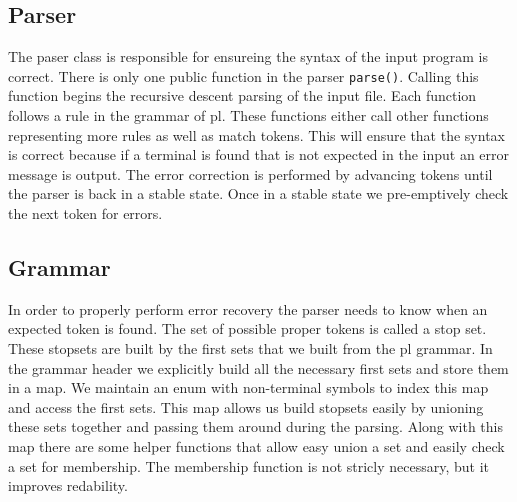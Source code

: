 \documentclass{article}
\begin{document}
\subsection{Parser}
The paser class is responsible for ensureing the syntax of the input program is correct.
There is only one public function in the parser \verb|parse()|. Calling this function begins
the recursive descent parsing of the input file. Each function follows a rule in the grammar
of pl. These functions either call other functions representing more rules as well as match
tokens. This will ensure that the syntax is correct because if a terminal is found that
is not expected in the input an error message is output.
The error correction is performed by advancing tokens until the parser is back in a stable state.
Once in a stable state we pre-emptively check the next token for errors.

\subsection{Grammar}
In order to properly perform error recovery the parser needs to know when an expected token is
found. The set of possible proper tokens is called a stop set. These stopsets are built by the
first sets that we built from the pl grammar. In the grammar header we explicitly build all
the necessary first sets and store them in a map. We maintain an enum with non-terminal
symbols to index this map and access the first sets. This map allows us build stopsets easily by
unioning these sets together and passing them around during the parsing. Along with this map
there are some helper functions that allow easy union a set and easily check a set for membership.
The membership function is not stricly necessary, but it improves redability.
\end{document}
